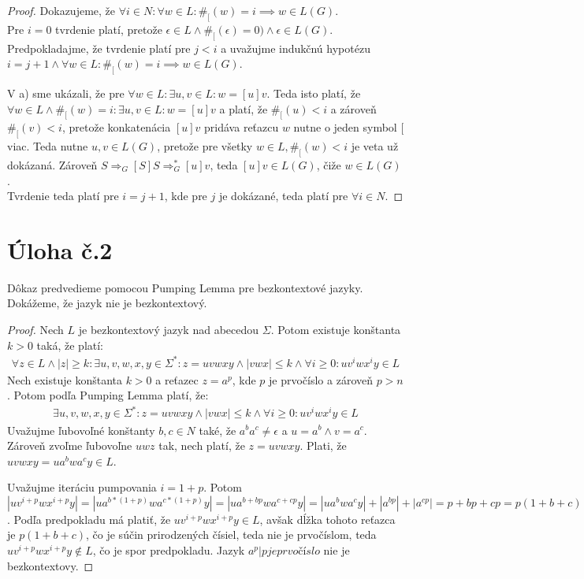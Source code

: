 \documentclass[10pt]{article}
\begin{document}
\begin{proof}
    Dokazujeme, že $\forall i \in N: \forall w \in L: \#_[(w) = i \implies w \in L(G)$.\\
    Pre $i = 0$ tvrdenie platí, pretože $\epsilon \in L \land \#_[(\epsilon) = 0) \land \epsilon \in
    L(G).$ \\

    Predpokladajme, že tvrdenie platí pre $j <  i$ a uvažujme indukčnú hypotézu $i = j+1 \land
    \forall w \in L: \#_[(w) = i \implies w \in L(G)$.

    V a) sme ukázali, že pre $\forall w \in L: \exists u,v \in L: w = [u]v$. Teda isto platí, že
    $\forall w \in L \land \#_[(w) = i: \exists u,v \in L: w = [u]v$ a platí, že $\#_[(u) < i$ a zároveň
    $\#_[(v) < i$, pretože konkatenácia $[u]v$ pridáva reťazcu $w$ nutne o jeden symbol $[$ viac.
    Teda nutne $u,v \in L(G)$, pretože pre všetky $w\in L, \#_[(w) < i$ je veta už dokázaná. Zároveň $S \Rightarrow_G [S]S \Rightarrow_G^* [u]v$,
    teda $[u]v \in L(G)$, čiže $w \in L(G)$. \\

    Tvrdenie teda platí pre $i = j + 1$, kde pre $j$ je dokázané, teda platí pre $\forall i \in N$. 
\end{proof}


\section*{Úloha č.2}
Dôkaz predvedieme pomocou Pumping Lemma pre bezkontextové jazyky. Dokážeme, že jazyk nie je
bezkontextový.

\begin{proof}
Nech $L$ je bezkontextový jazyk nad abecedou $\Sigma$. Potom existuje konštanta $k > 0$ taká, že platí:
    \begin{align}
        \forall z \in L \land |z| \geq k: \exists u,v,w,x,y \in \Sigma^*: z = uvwxy \land |vwx| \leq
        k \land \forall i \geq 0: uv^iwx^iy \in L
    \end{align}
Nech existuje konštanta $k > 0$ a reťazec $z=a^p$, kde $p$ je prvočíslo a zároveň $p > n$. Potom
podľa Pumping Lemma platí, že:
    \begin{align}
        \exists u,v,w,x,y \in \Sigma^*: z = uvwxy \land |vwx| \leq
        k \land \forall i \geq 0: uv^iwx^iy \in L
    \end{align}
Uvažujme ľubovoľné konštanty $b, c \in N$ také, že $a^ba^c \neq \epsilon$ a $u = a^b \land v =
    a^c$. Zároveň zvoľme ľubovoľne $uwz$ tak, nech platí, že $z = uvwxy$.
    Plati, že $uvwxy = ua^bwa^cy \in L$.

Uvažujme iteráciu pumpovania $i = 1+p$. 
    Potom $|uv^{i+p}wx^{i+p}y| = |ua^{b*(1+p)}wa^{c*(1+p)}y| = |ua^{b+bp}wa^{c+cp}y| = |ua^bwa^cy| +
    |a^{bp}|+|a^{cp}| = p + bp + cp = p(1+b+c)$. 
    Podľa predpokladu má platiť, že $uv^{i+p}wx^{i+p}y \in L$, avšak dĺžka tohoto reťazca je
    $p(1+b+c)$, čo je súčin prirodzených čísiel, teda nie je prvočíslom, teda $uv^{i+p}wx^{i+p}y \notin L$, čo je spor
    predpokladu. 
    Jazyk ${a^p | p je prvočíslo}$ nie je bezkontextovy.
\end{proof}
\end{document}
